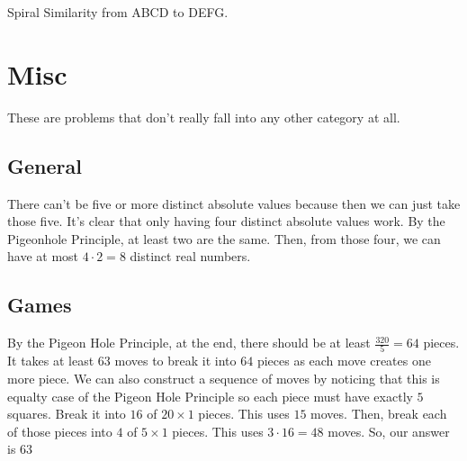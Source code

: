 \documentclass[11pt]{article}
\begin{document}

\begin{sol}
Spiral Similarity from ABCD to DEFG.
\end{sol}

\setcounter{problem}{0}
\section{Misc}
These are problems that don't really fall into any other category at all.
\subsection{General}

\begin{sol}
There can't be five or more distinct absolute values because then we can just take those five. It's clear that only having four distinct absolute values work. By the Pigeonhole Principle, at least two are the same. Then, from those four, we can have at most $4\cdot 2=\boxed{8}$ distinct real numbers.
\end{sol}

\subsection{Games}


\begin{sol} 
By the Pigeon Hole Principle, at the end, there should be at least $\frac{320}{5}=64$ pieces. It takes at least $63$ moves to break it into $64$ pieces as each move creates one more piece. We can also construct a sequence of moves by noticing that this is equalty case of the Pigeon Hole Principle so each piece must have exactly $5$ squares. Break it into $16$ of $20\times 1$ pieces. This uses $15$ moves. Then, break each of those pieces into $4$ of $5\times 1$ pieces. This uses $3\cdot 16=48$ moves. So, our answer is $\boxed{63}$
\end{sol}
\end{document}
